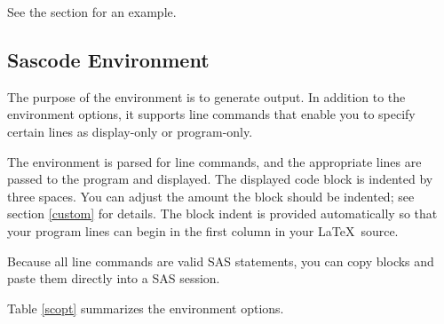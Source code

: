 \documentclass[article,oneside]{memoir}
\begin{document}
See the section  for an example.

  \subsection{Sascode Environment}

The purpose of the  environment is to generate output.
In addition to the environment options, it supports
line commands that enable you to specify certain lines as display-only or program-only.

 The  environment is parsed for line commands, and the appropriate lines are
 passed to the program and displayed. The displayed code block is indented by three spaces.
  You can adjust the amount the block should be indented; see section \ref{custom} for
  details. The block indent is provided
  automatically so that your program lines can begin in the first column in your \LaTeX\ source.

  Because all line commands are valid SAS statements,
  you can copy  blocks and paste them directly
  into a SAS session.

Table \ref{scopt} summarizes the  environment options.
%
%
\end{document}
